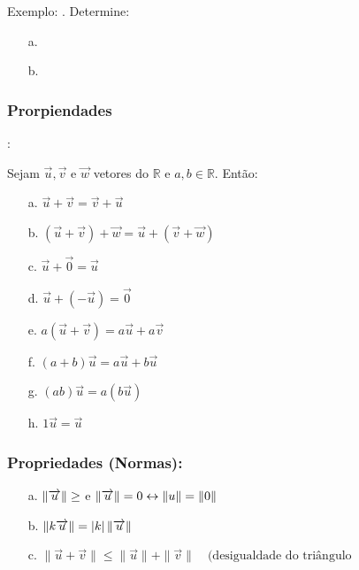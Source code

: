 \date{08-10-2024}

Exemplo: .
Determine: \\
\begin{itemize}
    \item[a.] \mathexpr{}
    \item[b. ]  
\end{itemize}

\subsubsection{Prorpiendades}: 

Sejam $\overrightarrow{u}, \overrightarrow{v}$ e $\overrightarrow{w}$ vetores do $\mathbb{R}$ e $a,b \in \mathbb{R}$.
Então: \\
\begin{itemize}
    \item[a.] $\overrightarrow{u} + \overrightarrow{v} = \overrightarrow{v} + \overrightarrow{u}$
    \item[b.] $(\overrightarrow{u}+ \overrightarrow{v}) + \overrightarrow{w} = \overrightarrow{u} + (\overrightarrow{v} + \overrightarrow{w})$  
    \item[c.] $\overrightarrow{u} + \overrightarrow{0} = \overrightarrow{u}$ 
    \item[d.] $\overrightarrow{u} + (-\overrightarrow{u}) = \overrightarrow{0}$ 
    \item[e.] $a (\overrightarrow{u} + \overrightarrow{v}) = a \overrightarrow{u} + a \overrightarrow{v}$
    \item[f.] $(a+b) \overrightarrow{u} = a \overrightarrow{u} + b \overrightarrow{u}$ 
    \item[g.] $(ab) \overrightarrow{u} = a (b \overrightarrow{u})$
    \item[h.] $1 \overrightarrow{u} = \overrightarrow{u}$ 
\end{itemize}

\subsubsection{Propriedades (Normas):}
\begin{itemize}
    \item[a.] $\left\lVert \overrightarrow{u} \right\rVert \geq$ e $\left\lVert \overrightarrow{u} \right\rVert = 0 \leftrightarrow \left\lVert u \right\rVert = \left\lVert 0 \right\rVert$
    \item[b.] $\left\lVert k \overrightarrow{u} \right\rVert = |k| \left\lVert \overrightarrow{u} \right\rVert$ 
    \item[c.] $ \|\vec{u} + \vec{v}\| \leq \|\vec{u}\| + \|\vec{v}\| \quad (\text{desigualdade do triângulo}$ 
\end{itemize}

